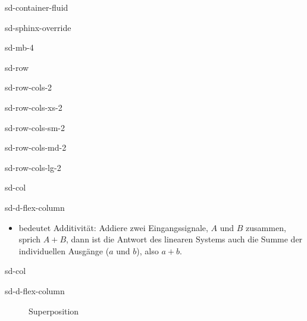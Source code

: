 \documentclass[letterpaper,10pt,english]{jupyterBook}
\let\sphinxpxdimen\pdfpxdimen\else\newdimen\sphinxpxdimen
\begin{document}
\begin{sphinxuseclass}{sd-container-fluid}
\begin{sphinxuseclass}{sd-sphinx-override}
\begin{sphinxuseclass}{sd-mb-4}
\begin{sphinxuseclass}{sd-row}
\begin{sphinxuseclass}{sd-row-cols-2}
\begin{sphinxuseclass}{sd-row-cols-xs-2}
\begin{sphinxuseclass}{sd-row-cols-sm-2}
\begin{sphinxuseclass}{sd-row-cols-md-2}
\begin{sphinxuseclass}{sd-row-cols-lg-2}
\begin{sphinxuseclass}{sd-col}
\begin{sphinxuseclass}{sd-d-flex-column}\begin{itemize}
\item {} 
\sphinxAtStartPar
{} bedeutet Additivität: Addiere zwei Eingangssignale, \(A\) und \(B\) zusammen, sprich \(A+B\), dann ist die Antwort des linearen Systems auch die Summe der individuellen Ausgänge (\(a\) und \(b\)), also \(a+b\).

\end{itemize}

\end{sphinxuseclass}
\end{sphinxuseclass}
\begin{sphinxuseclass}{sd-col}
\begin{sphinxuseclass}{sd-d-flex-column}
\begin{figure}[htbp]
\centering
\capstart

\noindent\sphinxincludegraphics[width=400\sphinxpxdimen]{{LTI_super}.jpg}
\caption{Superposition}\label{\detokenize{content/5_LTI:lti-super}}\end{figure}

\end{sphinxuseclass}
\end{sphinxuseclass}
\end{sphinxuseclass}
\end{sphinxuseclass}
\end{sphinxuseclass}
\end{sphinxuseclass}
\end{sphinxuseclass}
\end{sphinxuseclass}
\end{sphinxuseclass}
\end{sphinxuseclass}
\end{sphinxuseclass}
\end{document}
